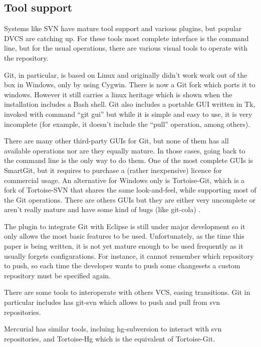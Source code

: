 \subsection{Tool support}

Systems like SVN have mature tool support and various plugins, but popular DVCS are catching up.
For these tools most complete interface is the command line, but for the usual operations, 
there are various visual tools to operate with the repository.

Git, in particular, is based on Linux and originally didn't work work out of the box in Windows, 
only by using Cygwin. 
There is now a Git fork which ports it to windows. However it still carries a linux heritage which is shown when the installation includes a Bash shell.
Git also includes a portable GUI written in Tk, invoked with command ``git gui'' 
but while it is simple and easy to use, it is very incomplete (for example, 
it doesn't include the ``pull'' operation, among others).

There are many other third-party GUIs for Git, but none of them has all available operations nor are they equally mature. 
In those cases, going back to the command line is the only way to do them. One of the most complete GUIs is SmartGit, but 
it requires to purchase a (rather inexpensive) licence for commercial usage. An alternative for Windows only 
is Tortoise-Git, which is a fork of Tortoise-SVN that shares the same look-and-feel, while supporting most of the 
Git operations. There are others GUIs but they are either very uncomplete or aren't really mature and have 
some kind of bugs (like git-cola) \cite{interfaces}.

The plugin to integrate Git with Eclipse is still under major development so it only allows the most basic features to be used.
Unfortunately, as the time this paper is being written, it is not yet mature enough to be used frequently as it usually forgets configurations. For instance, it cannot remember which repository to push, so each time the developer wants to push some changesets a custom repository must be specified again.

There are some tools to interoperate with others VCS, easing transitions.
Git in particular includes has git-svn which allows to push and pull from svn repositories. 

Mercurial has similar tools, incluing hg-subversion to interact with svn repositories, and Tortoise-Hg which is
the equivalent of Tortoise-Git.

